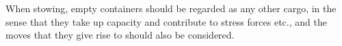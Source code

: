 
When stowing, empty containers should be regarded as any other cargo, in the sense that they take up capacity and contribute to stress forces etc., and the moves that they give rise to should also be considered.    